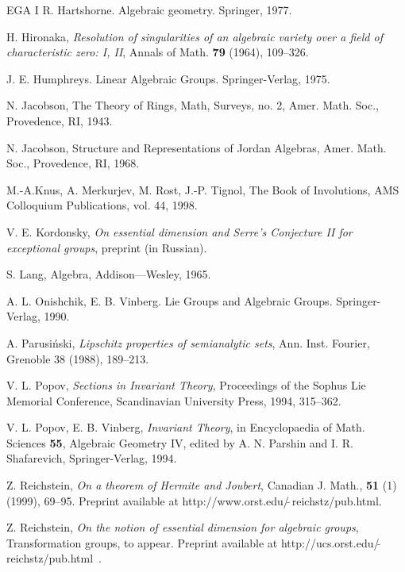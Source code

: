 \begin{thebibliography}{EGA I}
 R. Hartshorne.  Algebraic geometry.  Springer, 1977.

 H. Hironaka, {\em Resolution of singularities of an
algebraic variety over a field of characteristic zero: I, II},
Annals of Math. {\bf 79} (1964), 109--326.

 J. E. Humphreys. Linear Algebraic Groups. 
Springer-Verlag, 1975.

N. Jacobson, The Theory of Rings, Math, Surveys,
no. 2, Amer. Math. Soc., Provedence, RI, 1943.

N. Jacobson, Structure and Representations of
Jordan Algebras, Amer. Math. Soc., Provedence, RI, 1968.

M.-A.Knus, A. Merkurjev, M. Rost, J.-P. Tignol,
The Book of Involutions, AMS Colloquium Publications, vol. 44, 1998.

V. E. Kordonsky, {\em On essential dimension and
Serre's Conjecture II for exceptional groups}, preprint (in Russian).

S. Lang, Algebra, Addison---Wesley, 1965.

%

A. L. Onishchik, E. B. Vinberg. Lie Groups
and Algebraic Groups. Springer-Verlag, 1990.

 A. Parusi\'nski, {\em Lipschitz properties of semianalytic 
sets}, Ann. Inst. Fourier, Grenoble 38 (1988), 189--213.

V. L. Popov, {\em Sections in Invariant Theory}, Proceedings of the Sophus 
Lie Memorial Conference, Scandinavian University Press, 1994, 315--362.

 V. L. Popov, E. B. Vinberg, {\em Invariant Theory}, 
in Encyclopaedia
of Math. Sciences {\bf 55}, Algebraic Geometry IV, edited by 
A. N. Parshin and I. R. Shafarevich, Springer-Verlag, 1994.  

Z. Reichstein, 
{\em On a theorem of Hermite and Joubert}, Canadian J. Math., 
{\bf 51} (1) (1999), 69--95.
Preprint available at http://www.orst.edu/$\tilde{\;}$reichstz/pub.html. 

Z. Reichstein, {\em On the notion of essential dimension for
algebraic groups}, Transformation groups, to appear.
Preprint available at
http://ucs.orst.edu/$\tilde{\;}$reichstz/pub.html~.


\end{thebibliography}
